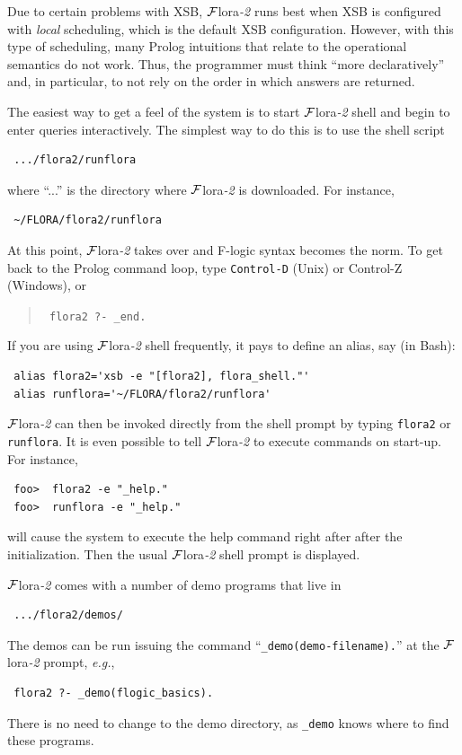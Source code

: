 \documentclass[11pt]{article}
\newcommand{\FLORA}{{\mbox{\sc ${\cal F}${lora}\rm\emph{-2}}}\xspace}
\newcommand{\fl}{\mbox{F-logic}\xspace}
\begin{document}
Due to certain problems with XSB, \FLORA runs best when XSB is configured
with \emph{local} scheduling, which is the default XSB configuration.
However, with this type of scheduling, many Prolog intuitions that relate
to the operational semantics do not work. Thus, the programmer must think
``more declaratively'' and, in particular, to not rely on the 
order in which answers are returned.


\label{runflora-page}
The easiest way to get a feel of the system
is to start \FLORA shell and begin to enter queries interactively.
The simplest way to do this is to use the shell script
\begin{verbatim}
 .../flora2/runflora  
\end{verbatim}
where ``...'' is the directory where \FLORA is downloaded. For instance,
\begin{verbatim}
 ~/FLORA/flora2/runflora  
\end{verbatim}

At this point, \FLORA takes over and \fl syntax becomes the
norm. To get back to the Prolog command loop, type {\tt Control-D} 
(Unix) or Control-Z (Windows), or 
\begin{quote}
  \tt
flora2 ?- \_end.  
\end{quote}

\noindent
If you are using \FLORA shell frequently, it pays to define an alias, say
(in Bash):
\begin{verbatim}
 alias flora2='xsb -e "[flora2], flora_shell."'
 alias runflora='~/FLORA/flora2/runflora'
\end{verbatim}
\FLORA can then be invoked directly from the shell prompt by typing
{\tt flora2} or {\tt runflora}. 
It is even possible to tell \FLORA to execute commands on start-up.
For instance, 
\begin{verbatim}
 foo>  flora2 -e "_help."
 foo>  runflora -e "_help."
\end{verbatim}
will cause the system to execute the help command right after after the
initialization. Then the usual \FLORA shell prompt is displayed.

\noindent
\FLORA comes with a number of demo programs that live in
\begin{verbatim}
 .../flora2/demos/
\end{verbatim}
The demos can be run issuing the command
``\verb|_demo(demo-filename).|''
at the \FLORA prompt, {\it e.g.},
\begin{verbatim}
 flora2 ?- _demo(flogic_basics).
\end{verbatim}
There is no need to change to the demo directory, as {\tt \_demo} knows
where to find these programs.
\end{document}
